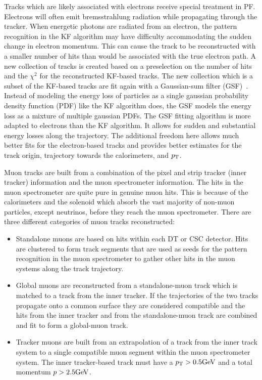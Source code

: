 Tracks which are likely associated with electrons receive special treatment in PF. Electrons
will often emit bremsstrahlung radiation while propagating through the tracker.
When energetic photons are radiated from an electron, the pattern recognition in the KF algorithm
may have difficulty accommodating the sudden change in electron momentum. This can cause the track to 
be reconstructed with a smaller number of hits than would be associated with the true electron
path. A new collection of tracks is created based on a preselection on the number of hits and 
the $\chi^2$ for the reconstructed KF-based tracks. The new collection which is a subset of the
KF-based tracks are fit again with a Gaussian-sum filter (GSF)~\cite{gsf_electrons}. Instead of
modeling the energy loss of particles as a single gaussian probability density function (PDF) like the KF
algorithm does, the GSF models the energy loss as a mixture of multiple gaussian PDFs. 
The GSF fitting algorithm is more adapted to electrons than the KF algorithm.
It allows for sudden and substantial energy losses along the trajectory. The
additional freedom here allows much better fits for the electron-based tracks and provides
better estimates for the track origin, trajectory towards the calorimeters, and $p_\mathrm{T}$.

Muon tracks are built from a combination of the pixel and strip tracker (inner tracker) information and the
muon spectrometer information. 
The hits in the muon spectrometer are quite pure in genuine muon hits. This is because of the
calorimeters and the solenoid which absorb the vast majority of non-muon particles, except neutrinos, 
before they reach the muon spectrometer. There are three different categories of muon tracks
reconstructed:
\begin{itemize}
\item Standalone muons are based on hits within each DT or CSC detector. Hits are clustered to form 
track segments that are used as seeds for the pattern recognition in the muon spectrometer to gather
other hits in the muon systems along the track trajectory.
\item Global muons are reconstructed from a standalone-muon track which is matched to a track 
from the inner tracker. If the trajectories of the two tracks propagate onto a common surface 
they are considered compatible and the hits from the inner tracker and from the standalone-muon 
track are combined and fit to form a global-muon track.
\item Tracker muons are built from an extrapolation of a track from the inner track system to a
single compatible muon segment within the muon spectrometer system. The inner tracker-based track must have 
a $p_\mathrm{T} > 0.5\mathrm{GeV}$ and a total momentum $p > 2.5\mathrm{GeV}$.
\end{itemize}


